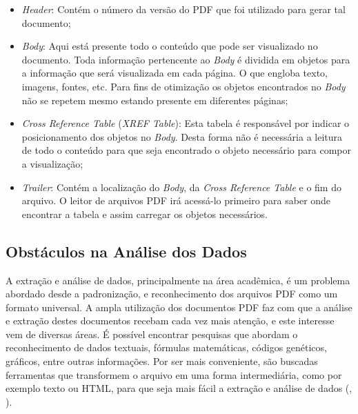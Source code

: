 \begin{itemize}
    \item \textit{Header}: Contém o número da versão do PDF que foi utilizado para gerar tal documento;
    
    \item \textit{Body}: Aqui está presente todo o conteúdo que pode ser visualizado no documento. Toda informação pertencente ao \textit{Body} é dividida em objetos para a informação que será visualizada em cada página. O que engloba texto, imagens, fontes, etc.
    Para fins de otimização os objetos encontrados no \textit{Body} não se repetem mesmo estando presente em diferentes páginas;
    
    \item \textit{Cross Reference Table} (\textit{XREF Table}): Esta tabela é responsável por indicar o posicionamento dos objetos no \textit{Body}. Desta forma não é necessária a leitura de todo o conteúdo para que seja encontrado o objeto necessário para compor a visualização;
    
    \item \textit{Trailer}: Contém a localização do \textit{Body}, da \textit{Cross Reference Table} e o fim do arquivo. O leitor de arquivos PDF irá acessá-lo primeiro para saber onde encontrar a tabela e assim carregar os objetos necessários.
\end{itemize}

\subsection{Obstáculos na Análise dos Dados}

A extração e análise de dados, principalmente na área acadêmica, é um problema abordado desde a padronização, e reconhecimento dos arquivos PDF como um formato universal. A ampla utilização dos documentos PDF faz com que a análise e extração destes documentos recebam cada vez mais atenção, e este interesse vem de diversas áreas. É possível encontrar pesquisas que abordam o reconhecimento de dados textuais, fórmulas matemáticas, códigos genéticos, gráficos, entre outras informações. Por ser mais conveniente, são buscadas ferramentas que transformem o arquivo em uma forma intermediária, como por exemplo texto ou HTML, para que seja mais fácil a extração e análise de dados (\citeauthor{ajedig2011pdf}, \citeyear{ajedig2011pdf}).

